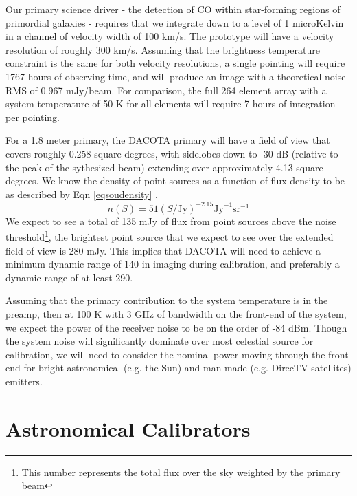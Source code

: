 \documentclass[preprint]{aastex}
\begin{document}
Our primary science driver - the detection of CO within star-forming regions of primordial galaxies - requires that we integrate down to a level of 1 microKelvin in a channel of velocity width of 100 km/s. The prototype will have a velocity resolution of roughly 300 km/s. Assuming that the brightness temperature constraint is the same for both velocity resolutions, a single pointing will require 1767 hours of observing time, and will produce an image with a theoretical noise RMS of 0.967 mJy/beam. For comparison, the full 264 element array with a system temperature of 50 K for all elements will require 7 hours of integration per pointing.

For a 1.8 meter primary, the DACOTA primary will have a field of view that covers roughly 0.258 square degrees, with sidelobes down to -30 dB (relative to the peak of the sythesized beam) extending over approximately 4.13 square degrees. We know the density of point sources as a function of flux density to be as described by Eqn \ref{eqsoudensity} \citep{MNR20109C}.
\begin{equation} \label{eqsoudensity}
n(S)=51 (S/\text{Jy})^{-2.15} \text{Jy}^{-1} \text{sr}^{-1}
\end{equation}
We expect to see a total of 135 mJy of flux from point sources above the noise threshold\footnote{This number represents the total flux over the sky weighted by the primary beam}, the brightest point source that we expect to see over the extended field of view is 280 mJy. This implies that DACOTA will need to achieve a minimum dynamic range of 140 in imaging during calibration, and preferably a dynamic range of at least 290.

Assuming that the primary contribution to the system temperature is in the preamp, then at 100 K with 3 GHz of bandwidth on the front-end of the system, we expect the power of the receiver noise to be on the order of -84 dBm. Though the system noise will significantly dominate over most celestial source for calibration, we will need to consider the nominal power moving through the front end for bright astronomical (e.g. the Sun) and man-made (e.g. DirecTV satellites) emitters.
\section{Astronomical Calibrators}\label{seccalibrate}
\end{document}
